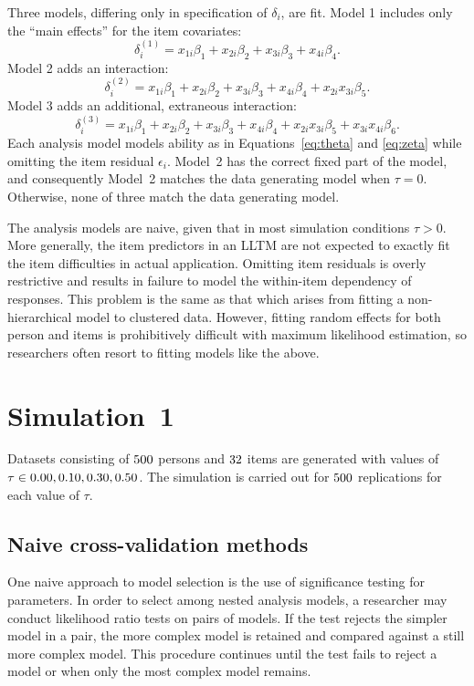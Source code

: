 \documentclass[12pt, letterpaper]{article}
\begin{document}
Three models, differing only in specification of $\delta_i$, are fit. Model 1 includes only the ``main effects'' for the item covariates:
\begin{equation}
\delta_i^{(1)} = x_{1i}\beta_1 + x_{2i}\beta_2 + x_{3i}\beta_3 + x_{4i}\beta_4
.\end{equation}
Model 2 adds an interaction:
\begin{equation}
\delta_i^{(2)} = x_{1i}\beta_1 + x_{2i}\beta_2 + x_{3i}\beta_3 + x_{4i}\beta_4
+ x_{2i}x_{3i}\beta_5
.\end{equation}
Model 3 adds an additional, extraneous interaction:
\begin{equation}
\delta_i^{(3)} = x_{1i}\beta_1 + x_{2i}\beta_2 + x_{3i}\beta_3 + x_{4i}\beta_4
+ x_{2i}x_{3i}\beta_5 + x_{3i}x_{4i}\beta_6
.\end{equation}
Each analysis model models ability as in Equations~\ref{eq:theta} and \ref{eq:zeta} while omitting the item residual $\epsilon_i$. 
Model~2 has the correct fixed part of the model, and consequently Model~2 matches the data generating model when $\tau = 0$. Otherwise, none of three match the data generating model.
 
The analysis models are naive, given that in most simulation conditions $\tau > 0$. 
More generally, the item predictors in an LLTM are not expected to exactly fit the item difficulties in actual application.
Omitting item residuals is overly restrictive and results in failure to model the within-item dependency of responses. 
This problem is the same as that which arises from fitting a non-hierarchical model to clustered data. 
However, fitting random effects for both person and items is prohibitively difficult with maximum likelihood estimation, so researchers often resort to fitting models like the above.


\section{Simulation~1}

Datasets consisting of $500$ persons and $32$ items are generated with values of $\tau \in 0.00, 0.10, 0.30, {} 0.50$. The simulation is carried out for $500$ replications for each value of $\tau$. 


\subsection{Naive cross-validation methods}

One naive approach to model selection is the use of significance testing for parameters. In order to select among nested analysis models, a researcher may conduct likelihood ratio tests on pairs of models. If the test rejects the simpler model in a pair, the more complex model is retained and compared against a still more complex model. This procedure continues until the test fails to reject a model or when only the most complex model remains.
\end{document}
